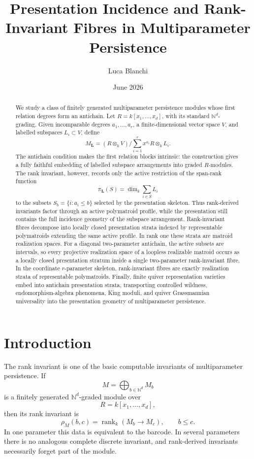 \documentclass[11pt]{article}
\title{Presentation Incidence and Rank-Invariant Fibres in Multiparameter Persistence}
\author{Luca Blanchi}
\date{June 2026}
\begin{document}
\maketitle

\begin{abstract}
We study a class of finitely generated multiparameter persistence modules whose first relation degrees form an antichain. Let \(R=k[x_1,\ldots,x_d]\), with its standard \(\mathbb N^d\)-grading. Given incomparable degrees \(a_1,\ldots,a_r\), a finite-dimensional vector space \(V\), and labelled subspaces \(L_i\subset V\), define
\[
M_{\mathbf L}=
(R\otimes_k V)\Big/
\sum_{i=1}^r x^{a_i}R\otimes_k L_i .
\]
The antichain condition makes the first relation blocks intrinsic: the construction gives a fully faithful embedding of labelled subspace arrangements into graded \(R\)-modules. The rank invariant, however, records only the active restriction of the span-rank function
\[
\pi_{\mathbf L}(S)=\dim_k\sum_{i\in S}L_i
\]
to the subsets \(S_b=\{i:a_i\le b\}\) selected by the presentation skeleton. Thus rank-derived invariants factor through an active polymatroid profile, while the presentation still contains the full incidence geometry of the subspace arrangement. Rank-invariant fibres decompose into locally closed presentation strata indexed by representable polymatroids extending the same active profile. In rank one these strata are matroid realization spaces. For a diagonal two-parameter antichain, the active subsets are intervals, so every projective realization space of a loopless realizable matroid occurs as a locally closed presentation stratum inside a single two-parameter rank-invariant fibre. In the coordinate \(r\)-parameter skeleton, rank-invariant fibres are exactly realization strata of representable polymatroids. Finally, finite quiver representation varieties embed into antichain presentation strata, transporting controlled wildness, endomorphism-algebra phenomena, King moduli, and quiver Grassmannian universality into the presentation geometry of multiparameter persistence.
\end{abstract}

\section{Introduction}

The rank invariant is one of the basic computable invariants of multiparameter persistence. If
\[
M=\bigoplus_{b\in\mathbb N^d}M_b
\]
is a finitely generated \(\mathbb N^d\)-graded module over
\[
R=k[x_1,\ldots,x_d],
\]
then its rank invariant is
\[
\rho_M(b,c)=\operatorname{rank}_k(M_b\to M_c),
\qquad b\le c.
\]
In one parameter this data is equivalent to the barcode. In several parameters there is no analogous complete discrete invariant, and rank-derived invariants necessarily forget part of the module.
\end{document}
